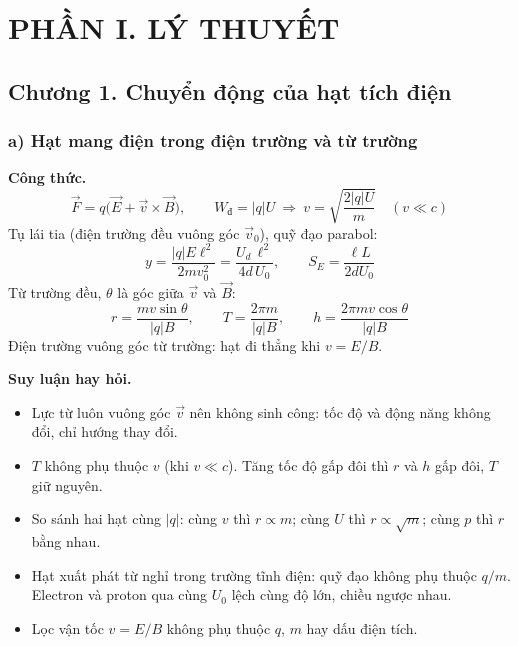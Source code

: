 \documentclass[11pt,a4paper]{article}
\newcommand{\Wd}{W_{\text{đ}}}
\begin{document}
\section*{PHẦN I. LÝ THUYẾT}

\subsection*{Chương 1. Chuyển động của hạt tích điện}

\subsubsection*{a) Hạt mang điện trong điện trường và từ trường}

\textbf{Công thức.}
\begin{equation*}
    \vec F=q\big(\vec E+\vec v\times\vec B\big),\qquad \Wd=|q|U\ \Longrightarrow\ v=\sqrt{\frac{2|q|U}{m}}\quad(v\ll c)
\end{equation*}
Tụ lái tia (điện trường đều vuông góc $\vec v_0$), quỹ đạo parabol:
\begin{equation*}
    y=\frac{|q|E\ell^2}{2mv_0^2}=\frac{U_d\,\ell^2}{4d\,U_0},\qquad S_E=\frac{\ell L}{2dU_0}
\end{equation*}
Từ trường đều, $\theta$ là góc giữa $\vec v$ và $\vec B$:
\begin{equation*}
    r=\frac{mv\sin\theta}{|q|B},\qquad T=\frac{2\pi m}{|q|B},\qquad h=\frac{2\pi mv\cos\theta}{|q|B}
\end{equation*}
Điện trường vuông góc từ trường: hạt đi thẳng khi $v=E/B$.

\textbf{Suy luận hay hỏi.}
\begin{itemize}
    \item Lực từ luôn vuông góc $\vec v$ nên không sinh công: tốc độ và động năng không đổi, chỉ hướng thay đổi.
    \item $T$ không phụ thuộc $v$ (khi $v\ll c$). Tăng tốc độ gấp đôi thì $r$ và $h$ gấp đôi, $T$ giữ nguyên.
    \item So sánh hai hạt cùng $|q|$: cùng $v$ thì $r\propto m$; cùng $U$ thì $r\propto\sqrt m$; cùng $p$ thì $r$ bằng nhau.
    \item Hạt xuất phát từ nghỉ trong trường tĩnh điện: quỹ đạo không phụ thuộc $q/m$. Electron và proton qua cùng $U_0$ lệch cùng độ lớn, chiều ngược nhau.
    \item Lọc vận tốc $v=E/B$ không phụ thuộc $q$, $m$ hay dấu điện tích.
\end{itemize}
\end{document}
